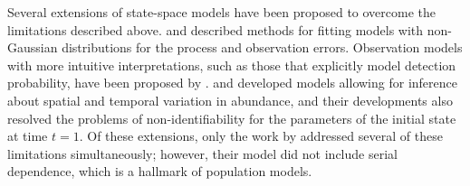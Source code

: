 \documentclass[12pt]{article}
\begin{document}

Several extensions of state-space models have been proposed to
overcome the limitations described above. \citet{devalpine_hastings:2002} and
\citet{brooks_etal:2004} described methods for fitting models with non-Gaussian
distributions for the process and observation errors. Observation models with
more intuitive interpretations, such as those that explicitly model
detection probability, have been proposed by 
\citet{kery_etal:2009}. \citet{lele_etal:1998} and 
\citet{kery_etal:2009} developed models allowing for inference about
spatial and temporal variation in abundance, and their developments
also resolved the problems of non-identifiability for the parameters
of the initial state at time $t=1$. Of these extensions, only
the work by \citet{kery_etal:2009} addressed several of these limitations
simultaneously; however, their model did not include serial
dependence, which is a hallmark of population models. %
\end{document}
